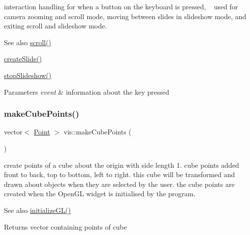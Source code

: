 interaction handling for when a button on the keyboard is pressed, ~\newline
used for camera zooming and scroll mode, moving between slides in slideshow mode, and exiting scroll and slideshow mode.

\begin{DoxySeeAlso}{See also}
\mbox{\hyperlink{classvis_addb1c0bca50661279c4ddaa441b54da5}{scroll()}} 

\mbox{\hyperlink{classvis_a131dcf83ee61359b99624ea2538898a4}{create\+Slide()}} 

\mbox{\hyperlink{classvis_a74dfdd319ae733d8ff96aa60bccd65b7}{stop\+Slideshow()}} 
\end{DoxySeeAlso}

\begin{DoxyParams}{Parameters}
{\em event} & information about the key pressed \\
\hline
\end{DoxyParams}
\mbox{\label{classvis_a5648b70ed8383268114b338cf020c9d9}} 
\subsubsection{\texorpdfstring{make\+Cube\+Points()}{makeCubePoints()}}
{\footnotesize\ttfamily vector$<$ \mbox{\hyperlink{struct_point}{Point}} $>$ vis\+::make\+Cube\+Points (\begin{DoxyParamCaption}{ }\end{DoxyParamCaption})}

create points of a cube about the origin with side length 1. cube points added front to back, top to bottom, left to right. this cube will be transformed and drawn about objects when they are selected by the user. the cube points are created when the Open\+GL widget is initialised by the program.

\begin{DoxySeeAlso}{See also}
\mbox{\hyperlink{classvis_aacc3b133f9fae3b66e1e13bfe789f314}{initialize\+G\+L()}} 
\end{DoxySeeAlso}
\begin{DoxyReturn}{Returns}
vector containing points of cube 
\end{DoxyReturn}
\mbox{\label{classvis_a9953ea49c09b9acec704d8175cb7865e}} 
